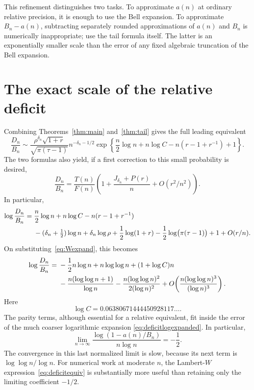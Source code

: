 \documentclass[11pt,a4paper]{article}
\numberwithin{equation}{section}
\theoremstyle{remark}
\begin{document}
This refinement distinguishes two tasks. To approximate $a(n)$ at ordinary
relative precision, it is enough to use the Bell expansion. To
approximate $B_n-a(n)$, subtracting separately rounded approximations of
$a(n)$ and $B_n$ is numerically inappropriate; use the tail formula
itself. The latter is an exponentially smaller scale than the error of
any fixed algebraic truncation of the Bell expansion.

\section{The exact scale of the relative deficit}\label{sec:deficit}

Combining Theorems~\ref{thm:main} and~\ref{thm:tail} gives the full leading
equivalent
\begin{equation}\label{eq:deficitequiv}
 \frac{D_n}{B_n}\sim
 \frac{\rho^{\delta_n}\sqrt{1+r}}{\sqrt{\pi(\tau-1)}}
 n^{-\delta_n-1/2}
 \exp\!\left\{\frac n2\log n+n\log C
        -n(r-1+r^{-1})+1\right\}.
\end{equation}
The two formulas also yield, if a first correction to this small
probability is desired,
\begin{equation}\label{eq:deficitfirst}
 \frac{D_n}{B_n}=
 \frac{T(n)}{F(n)}
 \left(1+\frac{J_{\delta_n}+P(r)}n+O(r^2/n^2)\right).
\end{equation}
In particular,
\begin{align}
 \log\frac{D_n}{B_n}
 ={}&\frac n2\log n+n\log C-n(r-1+r^{-1})\notag\\
 &-(\delta_n+\tfrac12)\log n+\delta_n\log\rho
   +\frac12\log(1+r)-\frac12\log\bigl(\pi(\tau-1)\bigr)+1
   +O(r/n).\label{eq:deficitlogexact}
\end{align}
On substituting~\eqref{eq:Wexpand}, this becomes
\begin{align}
 \log\frac{D_n}{B_n}
 ={}&-\frac12n\log n+n\log\log n+(1+\log C)n\notag\\
 &-\frac{n(\log\log n+1)}{\log n}
   -\frac{n(\log\log n)^2}{2(\log n)^2}
   +O\!\left(\frac{n(\log\log n)^3}{(\log n)^3}\right).
 \label{eq:deficitlogexpanded}
\end{align}
Here
\[
 \log C=0.06380671444450928117\ldots.
\]
The parity terms, although essential for a relative equivalent, fit inside
the error of the much coarser logarithmic expansion
\eqref{eq:deficitlogexpanded}. In particular,
\begin{equation}\label{eq:deficitlimit}
 \lim_{n\to\infty}
 \frac{\log(1-a(n)/B_n)}{n\log n}=-\frac12.
\end{equation}
The convergence in this last normalized limit is slow, because its next
term is $\log\log n/\log n$. For numerical work at moderate $n$, the
Lambert-$W$ expression~\eqref{eq:deficitequiv} is substantially more useful
than retaining only the limiting coefficient $-1/2$.
\end{document}
